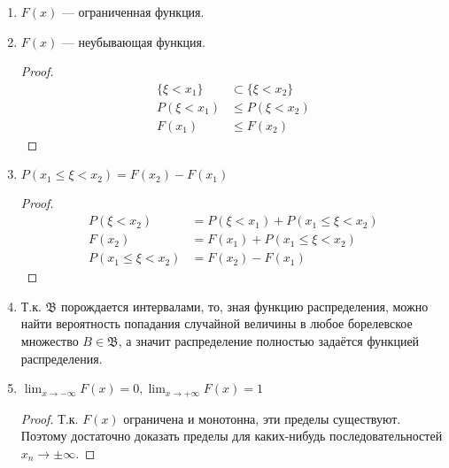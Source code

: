 \begin{prop}\itemfix
    \begin{enumerate}
        \item \(F(x)\) --- ограниченная функция.
        \item \(F(x)\) --- неубывающая функция.
              \begin{proof}
                  \begin{align*}
                      \{\xi < x_1\} & \subset \{\xi < x_2\} \\
                      P(\xi < x_1)  & \leq P(\xi < x_2)     \\
                      F(x_1)        & \leq F(x_2)
                  \end{align*}
              \end{proof}

        \item \(P(x_1 \leq \xi < x_2) = F(x_2) - F(x_1)\)
              \begin{proof}
                  \begin{align*}
                      P(\xi < x_2)          & = P(\xi < x_1) + P(x_1 \leq \xi < x_2) \\
                      F(x_2)                & = F(x_1) + P(x_1 \leq \xi < x_2)       \\
                      P(x_1 \leq \xi < x_2) & = F(x_2) - F(x_1)
                  \end{align*}
              \end{proof}
        \item Т.к. \(\mathfrak{B}\) порождается интервалами, то, зная функцию распределения, можно найти вероятность попадания случайной величины в любое борелевское множество \(B \in \mathfrak{B}\), а значит распределение полностью задаётся функцией распределения.

        \item \(\lim_{x \to -\infty} F(x) = 0, \lim_{x \to +\infty} F(x) = 1\)
              \begin{proof}
                  Т.к. \(F(x)\) ограничена и монотонна, эти пределы существуют. Поэтому достаточно доказать пределы для каких-нибудь последовательностей \(x_n \to \pm \infty\).


\end{proof}
\end{enumerate}
\end{prop}
